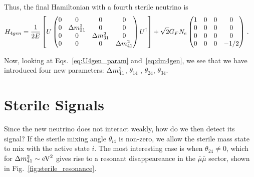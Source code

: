 \documentclass{thesis}
\begin{document}
Thus, the final Hamiltonian with a fourth sterile neutrino is 
\begin{align}\label{eq:H_4gen}
    H_{4gen} &= \frac{1}{2E}\left[U \begin{pmatrix}
            0 & 0 & 0 & 0\\
            0 & \dm_{21} & 0  & 0 \\
            0 & 0 & \dm_{31} & 0 \\
            0 & 0 & 0 & \dm_{41} \\
        \end{pmatrix} U^\dagger\right] + \sqrt{2}G_F N_e 
        \begin{pmatrix}
            1 & 0 & 0 & 0 \\
            0 & 0 & 0 & 0 \\
            0 & 0 & 0 & 0 \\
            0 & 0 & 0 & -1/2
        \end{pmatrix}\,. 
\end{align}

Now, looking at Eqs.~\ref{eq:U4gen_param} and~\ref{eq:dm4gen}, we see that we have introduced four new parameters: $\dm[41]$, $\theta_{14}$
, $\theta_{24}$, $\theta_{34}$. 

\section{Sterile Signals}
Since the new neutrino does not interact weakly, how do we then detect its signal? If the sterile mixing angle $\theta_{i4}$ is non-zero, 
we allow the sterile mass state to mix with the active state $i$. The most interesting case is when $\theta_{24} \neq 0$, 
which for $\dm[41] \sim \si{\eV \squared}$ gives rise to a resonant disappeareance in the $\bar\mu \bar\mu$ sector, shown in Fig.~\ref{fig:sterile_resonance}.
\end{document}
